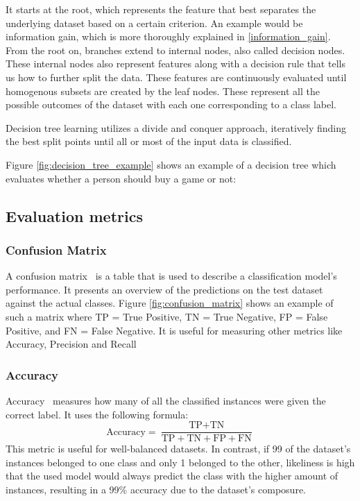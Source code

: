 It starts at the root, which represents the feature that best separates the underlying dataset based on a certain criterion. An example would be information gain, which is more thoroughly explained in \ref{information_gain}. From the root on, branches extend to internal nodes, also called decision nodes. These internal nodes also represent features along with a decision rule that tells us how to further split the data. These features are continuously evaluated until homogenous subsets are created by the leaf nodes. These represent all the possible outcomes of the dataset with each one corresponding to a class label.

Decision tree learning utilizes a divide and conquer approach, iteratively finding the best split points until all or most of the input data is classified.

Figure \ref{fig:decision_tree_example} shows an example of a decision tree which evaluates whether a person should buy a game or not:

\subsection{Evaluation metrics}

\subsubsection{Confusion Matrix}
A confusion matrix~\cite{evaluation_metrics} is a table that is used to describe a classification model's performance. It presents an overview of the predictions on the test dataset against the actual classes. Figure \ref{fig:confusion_matrix} shows an example of such a matrix where TP = True Positive, TN = True Negative, FP = False Positive, and FN = False Negative.
It is useful for measuring other metrics like Accuracy, Precision and Recall

\subsubsection{Accuracy}
Accuracy~\cite{evaluation_metrics} measures how many of all the classified instances were given the correct label.
It uses the following formula:
\[ \text{Accuracy} = \frac{\text{TP} + \text{TN}}{\text{TP} + \text{TN} + \text{FP} + \text{FN}} \]
This metric is useful for well-balanced datasets. In contrast, if 99 of the dataset's instances belonged to one class and only 1 belonged to the other, likeliness is high that the used model would always predict the class with the higher amount of instances, resulting in a 99\% accuracy due to the dataset's composure.

